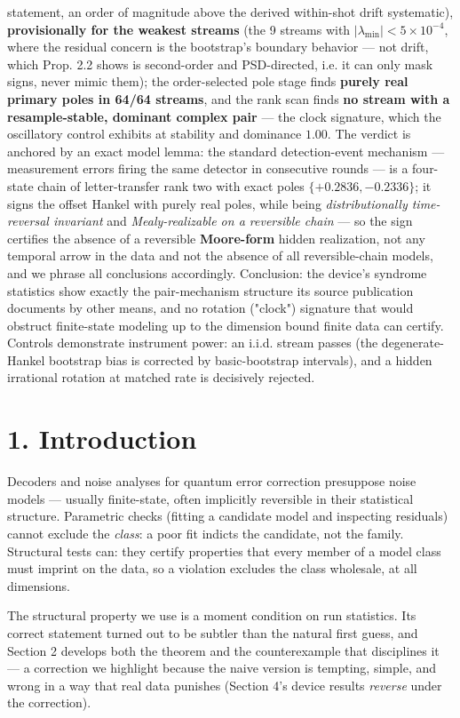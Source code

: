 \documentclass[11pt]{article}
\begin{document}
statement, an order of magnitude above the derived within-shot drift systematic), \textbf{provisionally for the weakest streams} (the 9 streams with $|\lambda_{\min}| < 5\times 10^{-4}$, where the residual concern is the bootstrap's boundary behavior — not drift, which Prop. 2.2 shows is second-order and PSD-directed, i.e. it can only mask signs, never mimic them); the order-selected pole stage finds \textbf{purely real primary poles in 64/64 streams}, and the rank scan finds \textbf{no stream with a resample-stable, dominant complex pair} — the clock signature, which the oscillatory control exhibits at stability and dominance $1.00$.  The verdict is anchored by an exact model lemma: the standard detection-event mechanism — measurement errors firing the same detector in consecutive rounds — is a four-state chain of letter-transfer rank two with exact poles $\{+0.2836, -0.2336\}$; it signs the offset Hankel with purely real poles, while being \emph{distributionally time-reversal invariant} and \emph{Mealy-realizable on a reversible chain} — so the sign certifies the absence of a reversible \textbf{Moore-form} hidden realization, not any temporal arrow in the data and not the absence of all reversible-chain models, and we phrase all conclusions accordingly.  Conclusion: the device's syndrome statistics show exactly the pair-mechanism structure its source publication documents by other means, and no rotation ("clock") signature that would obstruct finite-state modeling up to the dimension bound finite data can certify. Controls demonstrate instrument power: an i.i.d. stream passes (the degenerate-Hankel bootstrap bias is corrected by basic-bootstrap intervals), and a hidden irrational rotation at matched rate is decisively rejected.

\section*{1. Introduction}
Decoders and noise analyses for quantum error correction presuppose noise models — usually finite-state, often implicitly reversible in their statistical structure.  Parametric checks (fitting a candidate model and inspecting residuals) cannot exclude the \emph{class}: a poor fit indicts the candidate, not the family.  Structural tests can: they certify properties that every member of a model class must imprint on the data, so a violation excludes the class wholesale, at all dimensions.

The structural property we use is a moment condition on run statistics.  Its correct statement turned out to be subtler than the natural first guess, and Section 2 develops both the theorem and the counterexample that disciplines it — a correction we highlight because the naive version is tempting, simple, and wrong in a way that real data punishes (Section 4's device results \emph{reverse} under the correction).
\end{document}
